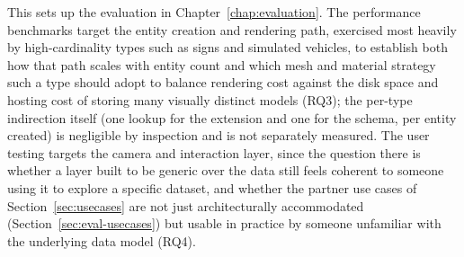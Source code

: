 This sets up the evaluation in Chapter~\ref{chap:evaluation}. The performance benchmarks target the entity creation and rendering path, exercised most heavily by high-cardinality types such as signs and simulated vehicles, to establish both how that path scales with entity count and which mesh and material strategy such a type should adopt to balance rendering cost against the disk space and hosting cost of storing many visually distinct models (RQ3); the per-type indirection itself (one lookup for the extension and one for the schema, per entity created) is negligible by inspection and is not separately measured. The user testing targets the camera and interaction layer, since the question there is whether a layer built to be generic over the data still feels coherent to someone using it to explore a specific dataset, and whether the partner use cases of Section~\ref{sec:usecases} are not just architecturally accommodated (Section~\ref{sec:eval-usecases}) but usable in practice by someone unfamiliar with the underlying data model (RQ4).
